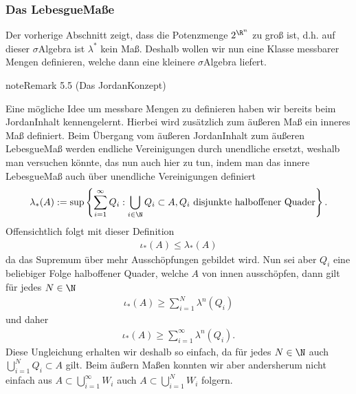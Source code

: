 \documentclass[letterpaper,10pt,german]{jupyterBook}
\begin{document}
\subsubsection{Das Lebesgue\sphinxhyphen{}Maße}
\label{\detokenize{masstheorie/masstheorie:das-lebesgue-masze}}
\sphinxAtStartPar
Der vorherige Abschnitt zeigt, dass die Potenzmenge \(2^{\R^n}\) zu groß ist, d.h. auf dieser \(\sigma\)\sphinxhyphen{}Algebra ist \(\lambda^\ast\) kein Maß. Deshalb wollen wir nun eine Klasse messbarer Mengen definieren, welche dann eine kleinere \(\sigma\)\sphinxhyphen{}Algebra liefert.
\label{masstheorie/masstheorie:remark-36}
\begin{sphinxadmonition}{note}{Remark 5.5 (Das Jordan\sphinxhyphen{}Konzept)}



\sphinxAtStartPar
Eine mögliche Idee um messbare Mengen zu definieren haben wir bereits beim Jordan\sphinxhyphen{}Inhalt kennengelernt. Hierbei wird zusätzlich zum äußeren Maß ein inneres Maß definiert. Beim Übergang vom äußeren Jordan\sphinxhyphen{}Inhalt zum äußeren Lebesgue\sphinxhyphen{}Maß werden endliche Vereinigungen durch unendliche ersetzt, weshalb man versuchen könnte, das nun auch hier zu tun, indem man das innere Lebesgue\sphinxhyphen{}Maß auch über unendliche Vereinigungen definiert
\begin{equation*}
\begin{split}\lambda_\ast(A) := \sup\left\{\sum_{i=1}^\infty Q_i: \bigcup_{i\in\N} Q_i \subset A, Q_i\text{ disjunkte halboffener Quader}\right\}.\end{split}
\end{equation*}
\sphinxAtStartPar
Offensichtlich folgt mit dieser Definition
\begin{equation*}
\begin{split}\iota_\ast(A)\leq \lambda_\ast(A)\end{split}
\end{equation*}
\sphinxAtStartPar
da das Supremum über mehr Ausschöpfungen gebildet wird. Nun sei aber \(Q_i\) eine beliebiger Folge halboffener Quader, welche \(A\) von innen ausschöpfen, dann gilt für jedes \(N\in\N\)
\begin{equation*}
\begin{split}\iota_\ast(A) \geq \sum_{i=1}^N \lambda^n(Q_i)\end{split}
\end{equation*}
\sphinxAtStartPar
und daher
\begin{equation*}
\begin{split}\iota_\ast(A)\geq \sum_{i=1}^\infty \lambda^n(Q_i).\end{split}
\end{equation*}
\sphinxAtStartPar
Diese Ungleichung erhalten wir deshalb so einfach, da für jedes \(N\in\N\) auch \(\bigcup_{i=1}^N Q_i\subset A\) gilt. Beim äußern Maßen konnten wir aber andersherum nicht einfach aus \(A\subset \bigcup_{i=1}^\infty W_i\) auch \(A\subset \bigcup_{i=1}^N W_i\) folgern.


\end{sphinxadmonition}
\end{document}

